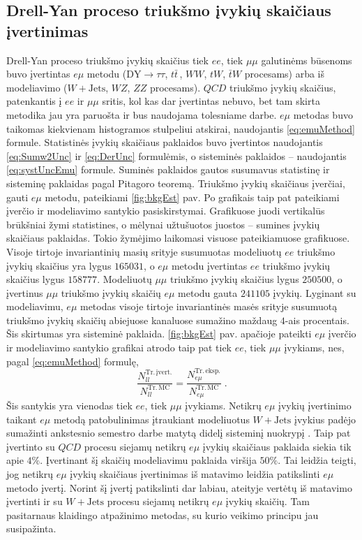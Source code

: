 \documentclass[a4paper, 12pt, oneside]{article}
\newcommand{\emu}{e\mu}
\newcommand{\mumu}{\mu\mu}
\newcommand{\WJets}{W\! +\!\mathrm{Jets}}
\newcommand{\DYtau}{\mathrm{DY} \! \rightarrow \! \tau\tau}
\newcommand{\QCD}{QC\! D}
\newlength\q
\begin{document}
\subsection{Drell-Yan proceso triukšmo įvykių skaičiaus įvertinimas}
Drell-Yan proceso triukšmo įvykių skaičius tiek $ee$, tiek $\mumu$ galutinėms būsenoms buvo įvertintas $\emu$
metodu ($\DYtau$, $t\bar{t}\,$, $WW$, $tW$, $\bar{t}W$ procesams) arba iš modeliavimo ($W+\mathrm{Jets}$, $WZ$,
$ZZ$ procesams).
$QCD$ triukšmo įvykių skaičius, patenkantis į $ee$ ir $\mu\mu$ sritis, kol kas dar įvertintas nebuvo, bet tam skirta metodika
jau yra paruošta ir bus naudojama tolesniame darbe.
$\emu$ metodas buvo taikomas kiekvienam histogramos stulpeliui atskirai, naudojantis \eqref{eq:emuMethod} formule.
Statistinės įvykių skaičiaus paklaidos buvo įvertintos naudojantis \eqref{eq:Sumw2Unc} ir \eqref{eq:DerUnc}
formulėmis, o sisteminės paklaidos -- naudojantis \eqref{eq:systUncEmu} formule.
Suminės paklaidos gautos susumavus statistinę ir sisteminę paklaidas pagal Pitagoro teoremą.
Triukšmo įvykių skaičiaus įverčiai, gauti $\emu$ metodu, pateikiami \ref{fig:bkgEst} pav.
Po grafikais taip pat pateikiami įverčio ir modeliavimo santykio pasiskirstymai.
Grafikuose juodi vertikalūs brūkšniai žymi statistines, o mėlynai užtušuotos juostos -- sumines įvykių skaičiaus paklaidas.
Tokio žymėjimo laikomasi visuose pateikiamuose grafikuose.
Visoje tirtoje invariantinių masių srityje susumuotas modeliuotų $ee$ triukšmo įvykių skaičius yra lygus $165031$,
o $e\mu$ metodu įvertintas $ee$ triukšmo įvykių skaičius lygus $158777$.
Modeliuotų $\mu\mu$ triukšmo įvykių skaičius lygus $250500$, o įvertinus $\mu\mu$ triukšmo įvykių skaičių  $e\mu$ metodu
gauta $241105$ įvykių.
Lyginant su modeliavimu, $\emu$ metodas visoje tirtoje invariantinės masės srityje susumuotą triukšmo įvykių skaičių
abiejuose kanaluose sumažino maždaug $4$-ais procentais.
Šis skirtumas yra sisteminė paklaida.
\ref{fig:bkgEst} pav. apačioje pateikti $\emu$ įverčio ir modeliavimo santykio grafikai atrodo taip pat
tiek $ee$, tiek $\mu\mu$ įvykiams, nes, pagal \eqref{eq:emuMethod} formulę,
$$\frac{N_{ll}^{\mathrm{Tr. \, įvert.}}}{N_{ll}^{\mathrm{Tr. \, MC}}} =
\frac{N_{\emu}^{\mathrm{Tr. \, eksp.}}}{N_{\emu}^{\mathrm{Tr. \, MC}}} \; .$$
Šis santykis yra vienodas tiek $ee$, tiek $\mu\mu$ įvykiams.
Netikrų $\emu$ įvykių įvertinimo taikant $\emu$ metodą patobulinimas įtraukiant modeliuotus $\WJets$ įvykius padėjo
sumažinti ankstesnio semestro darbe matytą didelį sisteminį nuokrypį \cite{MAk1}.
Taip pat įvertinto su $\QCD$ procesu siejamų netikrų $\emu$ įvykių skaičiaus paklaida siekia tik apie $4\%$.
Įvertinant šį skaičių modeliavimu paklaida viršija $50\%$.
Tai leidžia teigti, jog netikrų $\emu$ įvykių skaičiaus įvertinimas iš matavimo leidžia patikslinti $\emu$ metodo įvertį.
Norint šį įvertį patikslinti dar labiau, ateityje vertėtų iš matavimo įvertinti ir su $\WJets$ procesu siejamų netikrų $\emu$ įvykių skaičių.
Tam pasitarnaus klaidingo atpažinimo metodas, su kurio veikimo principu jau susipažinta.
\end{document}

